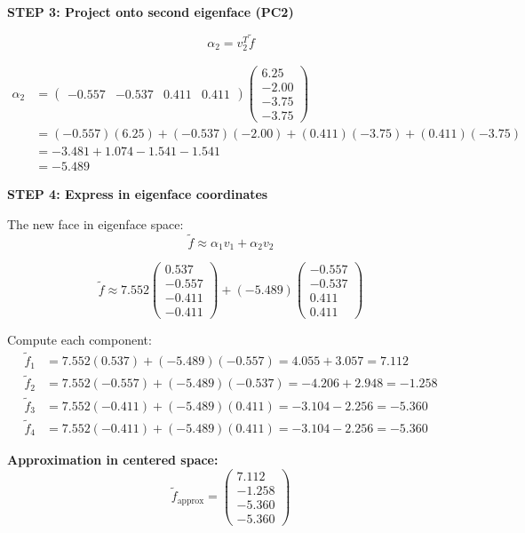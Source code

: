 \documentclass[12pt]{article}
\begin{document}
\begin{solution}
\textbf{STEP 3: Project onto second eigenface (PC2)}

\[
\alpha_2 = v_2^T \tilde{f}
\]

\begin{align*}
\alpha_2 &= \begin{pmatrix}
-0.557 & -0.537 & 0.411 & 0.411
\end{pmatrix}
\begin{pmatrix}
6.25 \\
-2.00 \\
-3.75 \\
-3.75
\end{pmatrix} \\
&= (-0.557)(6.25) + (-0.537)(-2.00) + (0.411)(-3.75) + (0.411)(-3.75) \\
&= -3.481 + 1.074 - 1.541 - 1.541 \\
&= -5.489
\end{align*}

\textbf{STEP 4: Express in eigenface coordinates}

The new face in eigenface space:
\[
\tilde{f} \approx \alpha_1 v_1 + \alpha_2 v_2
\]

\[
\tilde{f} \approx 7.552 \begin{pmatrix}
0.537 \\
-0.557 \\
-0.411 \\
-0.411
\end{pmatrix} + (-5.489) \begin{pmatrix}
-0.557 \\
-0.537 \\
0.411 \\
0.411
\end{pmatrix}
\]

Compute each component:
\begin{align*}
\tilde{f}_1 &= 7.552(0.537) + (-5.489)(-0.557) = 4.055 + 3.057 = 7.112 \\
\tilde{f}_2 &= 7.552(-0.557) + (-5.489)(-0.537) = -4.206 + 2.948 = -1.258 \\
\tilde{f}_3 &= 7.552(-0.411) + (-5.489)(0.411) = -3.104 - 2.256 = -5.360 \\
\tilde{f}_4 &= 7.552(-0.411) + (-5.489)(0.411) = -3.104 - 2.256 = -5.360
\end{align*}

\textbf{Approximation in centered space:}
\[
\tilde{f}_{\text{approx}} = \begin{pmatrix}
7.112 \\
-1.258 \\
-5.360 \\
-5.360
\end{pmatrix}
\]


\end{solution}
\end{document}
